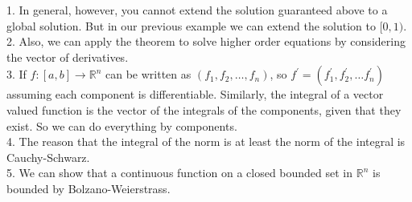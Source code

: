 \begin{remark}
    1. In general, however, you cannot extend the solution guaranteed above to a global solution.
    But in our previous example we can extend the solution to $[0,1)$.\\
    2. Also, we can apply the theorem to solve higher order equations by considering the vector of derivatives.\\
    3. If $f:[a,b]\to\mathbb R^n$ can be written as $(f_1,f_2,\ldots,f_n)$, so $f^\prime=(f_1^\prime,f_2^\prime,\ldots f_n^\prime)$ assuming each component is differentiable.
    Similarly, the integral of a vector valued function is the vector of the integrals of the components, given that they exist.
    So we can do everything by components.\\
    4. The reason that the integral of the norm is at least the norm of the integral is Cauchy-Schwarz.\\
    5. We can show that a continuous function on a closed bounded set in $\mathbb R^n$ is bounded by Bolzano-Weierstrass.
\end{remark}
